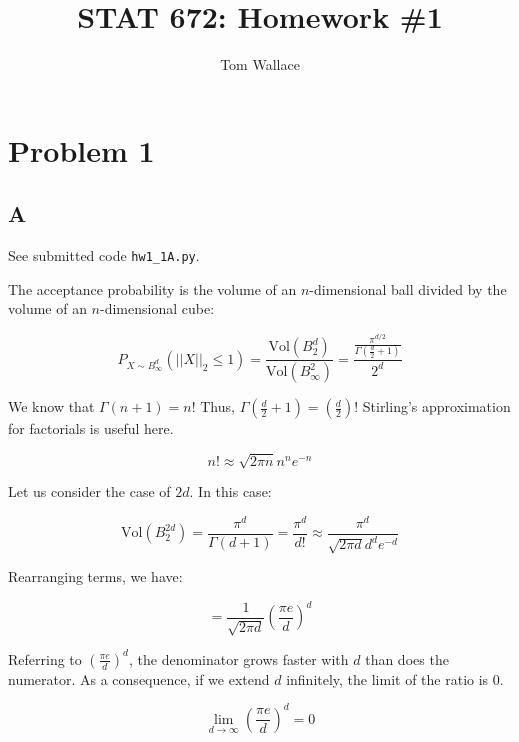 \documentclass{report}
\title{STAT 672: Homework \#1}
\author{Tom Wallace}
\begin{document}
\maketitle

\section*{Problem 1}

\subsection*{A}

See submitted code \texttt{hw1\_1A.py}.

The acceptance probability is the volume of an $n$-dimensional ball divided by
the volume of an $n$-dimensional cube:

\begin{equation}
P_{X \sim B^d_\infty}(||X||_2 \leq 1) =
\frac{\mathrm{Vol}(B^d_2)}{\mathrm{Vol}(B^2_\infty)}
= \frac{\frac{\pi ^ {d/2}}{\Gamma(\frac{d}{2} + 1)}}{2^d}
\end{equation}

We know that $\Gamma (n+1) = n!$ Thus, $\Gamma (\frac{d}{2} + 1) = (\frac{d}{2})!$ Stirling's 
approximation for factorials is useful here.

\begin{equation}
n! \approx \sqrt{2 \pi n}n^ne^{-n}
\end{equation}

Let us consider the case of $2d$. In this case:

\begin{equation}
\mathrm{Vol}(B^{2d}_2) = \frac{\pi ^ d}{\Gamma(d + 1)} = \frac{\pi^d}{d!}
\approx \frac{\pi^d}{\sqrt{2\pi d}d^de^{-d}}
\end{equation}

Rearranging terms, we have:

\begin{equation}
= \frac{1}{\sqrt{2\pi d}} \left( \frac{\pi e}{d} \right)^d
\end{equation}

Referring to $ \left( \frac{\pi e}{d} \right)^d$, the denominator grows faster with $d$ than does the
numerator. As a consequence, if we extend $d$ infinitely, the limit of the ratio is 0.

\begin{equation}
\lim_{d \to \infty} \left( \frac{\pi e}{d} \right)^d = 0
\end{equation}
\end{document}
